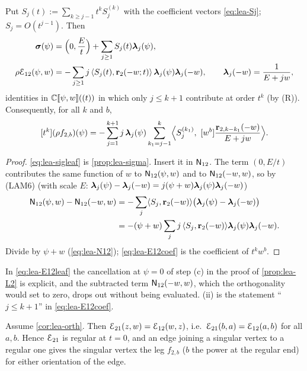 \begin{prop}
\label{prop:lea-E12}
Put $S_j(t) := \sum_{k\geq j-1}t^kS_j^{(k)}$ with the coefficient vectors \eqref{eq:lea-Sj}; $S_j = O(t^{j-1})$. Then
\begin{align}
\label{eq:lea-sigleaf}
\boldsymbol{\sigma}(\psi) &= \Bigl(0,\frac{E}{t}\Bigr) + \sum_{j\geq 1}S_j(t)\boldsymbol{\lambda}_j(\psi),\\
\label{eq:lea-E12leaf}
\rho\mathcal{E}_{12}(\psi,w) &= -\sum_{j\geq 1}j\,\langle S_j(t),\mathbf{r}_2(-w;t)\rangle\,\boldsymbol{\lambda}_j(\psi)\boldsymbol{\lambda}_j(-w),\qquad \boldsymbol{\lambda}_j(-w) = \frac{1}{E+jw},
\end{align}
identities in $\mathbb{C}[\![ \psi,w ]\!]((t))$ in which only $j\leq k+1$ contribute at order $t^k$ (by (R)). Consequently, for all $k$ and $b$,
\begin{equation}
\label{eq:lea-E12coef}
[t^k](\rho f_{2,b})(\psi) = -\sum_{j=1}^{k+1}j\,\boldsymbol{\lambda}_j(\psi)\sum_{k_1=j-1}^{k}\Bigl\langle S_j^{(k_1)},\ [w^b]\frac{\mathbf{r}_{2,k-k_1}(-w)}{E+jw}\Bigr\rangle .
\end{equation}
\end{prop}

\begin{proof}
\eqref{eq:lea-sigleaf} is \cref{prop:lea-sigma}. Insert it in $\mathsf{N}_{12}$. The term $(0,E/t)$ contributes the same function of $w$ to $\mathsf{N}_{12}(\psi,w)$ and to $\mathsf{N}_{12}(-w,w)$, so by (LAM6) (with scale $E$: $\boldsymbol{\lambda}_j(\psi) - \boldsymbol{\lambda}_j(-w) = j(\psi+w)\boldsymbol{\lambda}_j(\psi)\boldsymbol{\lambda}_j(-w)$)
\begin{align*}
\mathsf{N}_{12}(\psi,w) - \mathsf{N}_{12}(-w,w) &= -\sum_j\langle S_j,\mathbf{r}_2(-w)\rangle\bigl(\boldsymbol{\lambda}_j(\psi) - \boldsymbol{\lambda}_j(-w)\bigr)\\
&= -(\psi+w)\sum_jj\,\langle S_j,\mathbf{r}_2(-w)\rangle\boldsymbol{\lambda}_j(\psi)\boldsymbol{\lambda}_j(-w).
\end{align*}
Divide by $\psi+w$ (\eqref{eq:lea-N12}); \eqref{eq:lea-E12coef} is the coefficient of $t^kw^b$.
\end{proof}

In \eqref{eq:lea-E12leaf} the cancellation at $\psi = 0$ of step (c) in the proof of \cref{prop:lea-L2} is explicit, and the subtracted term $\mathsf{N}_{12}(-w,w)$, which the orthogonality would set to zero, drops out without being evaluated. (ii) is the statement ``$j\leq k+1$'' in \eqref{eq:lea-E12coef}.

\begin{prop}[the transposition $\Edge_{21} = \Edge_{12}^{T}$; regularity of $\Edge_{21}$]
\label{prop:lea-transp}
Assume \cref{cor:lea-orth}. Then $\mathcal{E}_{21}(z,w) = \mathcal{E}_{12}(w,z)$, i.e.\ $\mathcal{E}_{21}(b,a) = \mathcal{E}_{12}(a,b)$ for all $a,b$. Hence $\Edge_{21}$ is regular at $t = 0$, and an edge joining a singular vertex to a regular one gives the singular vertex the leg $f_{2,b}$ ($b$ the power at the regular end) for either orientation of the edge.
\end{prop}

